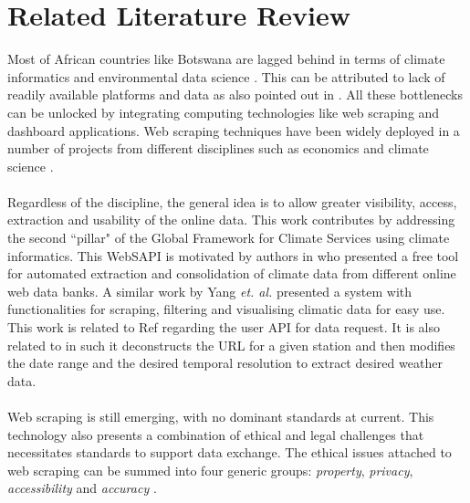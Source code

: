 \documentclass[a4paper, 10pt, conference]{ieeeconf}      %
\begin{document}
\section{\textbf{Related Literature Review}}
\label{LR}
\noindent
Most of African countries \cite{dinku2014bridging}  like Botswana \cite{Nkemelang2018} are lagged behind  in terms of climate informatics \cite{lyubchich2019statistics} and environmental data science \cite{lyubchich2019statistics,GIBERT20183}.  
This can be attributed to lack of readily available platforms and   data as also pointed out  in   \cite{schuol2007using,dinku2014bridging}. All these bottlenecks can be unlocked by integrating computing technologies like web scraping and dashboard applications. Web scraping techniques have been widely deployed in a number of projects from different disciplines such as economics \cite{smith2020making} and climate science \cite{yang2010development}. \\
\\
Regardless of the discipline, the general idea is to allow greater visibility, access, extraction and usability of the online data.  
This work contributes by addressing the second ``pillar" of the Global Framework for Climate Services \cite{VAUGHAN201665} using climate informatics.
This WebSAPI is motivated by authors in  \cite{BONIFACIO201513} who presented a free tool for automated extraction and consolidation of climate data from different online web data banks.   A similar work by Yang \emph{et. al.} \cite{yang2010development} presented a system with functionalities for scraping, filtering and visualising climatic data for easy use.   This work is related to Ref \cite{sitterson2020demonstration} regarding the user API for data request.
 	It is also related to \cite{BONIFACIO201513} in such it deconstructs the URL for a given station and then modifies the date range and the desired temporal resolution to extract desired weather data. 
\\
\\
Web scraping is still   emerging, with no dominant standards at current.  This technology also presents a combination of   ethical and legal challenges \cite{mason1986four,krotov2020tutorial} that necessitates  standards   to support data exchange. The ethical issues       attached to web scraping can be summed into four generic groups: \emph{property}, \emph{privacy}, \emph{accessibility} and  \emph{accuracy}  \cite{mason1986four}.
\end{document}
